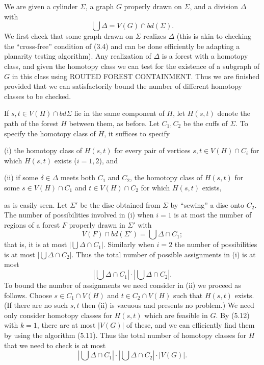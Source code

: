 We are given a cylinder $\Sigma$, a graph $G$ properly drawn on $\Sigma$, and a division $\Delta$ with
\begin{equation*}
\bigcup \Delta = V(G) \cap bd(\Sigma).
\end{equation*}
We first check that some graph drawn on $\Sigma$ realizes $\Delta$ (this is akin to checking the ``cross-free'' condition of (3.4) and can be done efficiently be adapting a planarity testing algorithm). Any realization of $\Delta$ is a forest with a homotopy class, and given the homotopy class we can test for the existence of a subgraph of $G$ in this class using ROUTED FOREST CONTAINMENT. Thus we are finished provided that we can satisfactorily bound the number of different homotopy classes to be checked.

If $s, t \in V(H) \cap bd \Sigma$ lie in the same component of $H$, let $H(s, t)$ denote the path of the forest $H$ between them, as before. Let $C_1, C_2$ be the cuffs of $\Sigma$. To specify the homotopy class of $H$, it suffices to specify

\hspace*{12pt}(i) the homotopy class of $H(s, t)$ for every pair of vertices $s, t \in V(H) \cap C_i$ for which $H(s, t)$ exists ($i = 1, 2$), and

\hspace*{12pt}(ii) if some $\delta \in \Delta$ meets both $C_1$ and $C_2$, the homotopy class of $H(s, t)$ for some $s \in V(H) \cap C_1$ and $t \in V(H) \cap C_2$ for which $H(s, t)$ exists,

as is easily seen. Let $\Sigma'$ be the disc obtained from $\Sigma$ by ``sewing'' a disc onto $C_2$. The number of possibilities involved in (i) when $i = 1$ is at most the number of regions of a forest $F$ properly drawn in $\Sigma'$ with
\begin{equation*}
V(F) \cap bd(\Sigma') = \bigcup \Delta \cap C_1;
\end{equation*}
that is, it is at most $|\bigcup \Delta \cap C_1|$. Similarly when $i = 2$ the number of possibilities is at most $|\bigcup \Delta \cap C_2|$. Thus the total number of possible assignments in (i) is at most
\begin{equation*}
\left| \bigcup \Delta \cap C_1 \right| \cdot \left| \bigcup \Delta \cap C_2 \right|.
\end{equation*}
To bound the number of assignments we need consider in (ii) we proceed as follows. Choose $s \in C_1 \cap V(H)$ and $t \in C_2 \cap V(H)$ such that $H(s, t)$ exists. (If there are no such $s, t$ then (ii) is vacuous and presents no problem.) We need only consider homotopy classes for $H(s, t)$ which are feasible in $G$. By (5.12) with $k = 1$, there are at most $|V(G)|$ of these, and we can efficiently find them by using the algorithm (5.11). Thus the total number of homotopy classes for $H$ that we need to check is at most
\begin{equation*}
\left| \bigcup \Delta \cap C_1 \right| \cdot \left| \bigcup \Delta \cap C_2 \right| \cdot |V(G)|.
\end{equation*}
